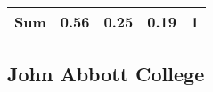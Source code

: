 \documentclass[]{book}
\theoremstyle{definition}
\theoremstyle{definition}
\theoremstyle{remark}
\begin{document}
\begin{longtable}[]{@{}ccccc@{}}
\begin{minipage}[t]{0.12\columnwidth}
\textbf{Sum}\strut
\end{minipage} & \begin{minipage}[t]{0.06\columnwidth}\centering\strut
0.56\strut
\end{minipage} & \begin{minipage}[t]{0.06\columnwidth}\centering\strut
0.25\strut
\end{minipage} & \begin{minipage}[t]{0.06\columnwidth}\centering\strut
0.19\strut
\end{minipage} & \begin{minipage}[t]{0.06\columnwidth}\centering\strut
1\strut
\end{minipage}\tabularnewline
\bottomrule
\end{longtable}

\subsection{John Abbott College}\label{john-abbott-college}
\end{document}
